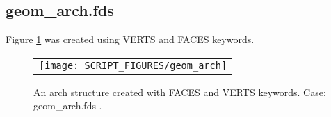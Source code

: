 \documentclass[12pt]{article}
\begin{document}
\subsection{geom\_arch.fds}
Figure \ref{fig:geom_arch} was created using VERTS and FACES keywords.

\begin{figure}
\begin{center}
\begin{tabular}{c}
 \texttt{[image: SCRIPT\_FIGURES/geom\_arch]}
  \end{tabular}
\end{center}
 \caption{An arch structure created with FACES and VERTS keywords.
 Case: geom\_arch.fds . }
\label{fig:geom_arch}
\end{figure}

%
%
%
\end{document}
